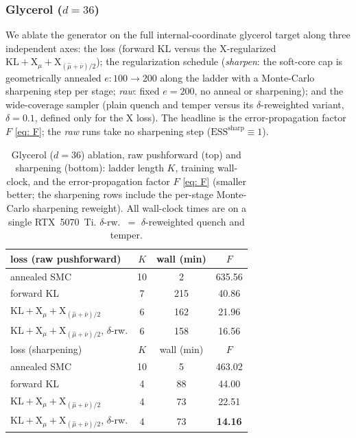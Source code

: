 \documentclass[11pt]{article}
\providecommand{\KL}{\mathrm{KL}}
\providecommand{\X}{\mathrm{X}}
\providecommand{\ESS}{\mathrm{ESS}}
\begin{document}
\subsubsection{Glycerol ($d = 36$)}
\label{sec: glycerol}

We ablate the generator on the full internal-coordinate glycerol target along three independent axes: the loss
(forward KL versus the $\X$-regularized $\KL{+}\X_\mu{+}\X_{(\hat\mu+\bar\nu)/2}$); the regularization schedule
(\emph{sharpen}: the soft-core cap is geometrically annealed $e\!:\!100\!\to\!200$ along the ladder with a
Monte-Carlo sharpening step per stage; \emph{raw}: fixed $e = 200$, no anneal or sharpening); and the
wide-coverage sampler (plain quench and temper versus its $\delta$-reweighted variant, $\delta = 0.1$, defined
only for the $\X$ loss). The headline is the error-propagation factor $F$ \eqref{eq: F}; the \emph{raw} runs
take no sharpening step ($\ESS^{\mathrm{sharp}} \equiv 1$).

\begin{table}[h]
    \centering
    \small
    \begin{tabular}{@{}lccc@{}}
        \toprule
        loss (raw pushforward) & $K$ & wall (min) & $F$ \\
        \midrule
        annealed SMC                                           & 10 & 2 & 635.56 \\
        forward KL                                             & 7 & 215 & 40.86 \\
        $\KL{+}\X_\mu{+}\X_{(\hat\mu+\bar\nu)/2}$              & 6 & 162 & 21.96 \\
        $\KL{+}\X_\mu{+}\X_{(\hat\mu+\bar\nu)/2}$, $\delta$-rw. & 6 & 158 & 16.56 \\
        \midrule
        loss (sharpening) & $K$ & wall (min) & $F$ \\
        \midrule
        annealed SMC                                           & 10 & 5 & 463.02 \\
        forward KL                                             & 4 & 88  & 44.00 \\
        $\KL{+}\X_\mu{+}\X_{(\hat\mu+\bar\nu)/2}$              & 4 & 73  & 22.51 \\
        $\KL{+}\X_\mu{+}\X_{(\hat\mu+\bar\nu)/2}$, $\delta$-rw. & 4 & 73  & \textbf{14.16} \\
        \bottomrule
    \end{tabular}
    \caption{Glycerol ($d = 36$) ablation, raw pushforward (top) and sharpening (bottom): ladder length $K$,
    training wall-clock, and the error-propagation factor $F$ \eqref{eq: F} (smaller better; the sharpening
    rows include the per-stage Monte-Carlo sharpening reweight). All wall-clock times are on a single
    RTX~5070~Ti. $\delta$-rw.\ $=$ $\delta$-reweighted quench and temper.}
    \label{tab: glycerol}
\end{table}
\end{document}

